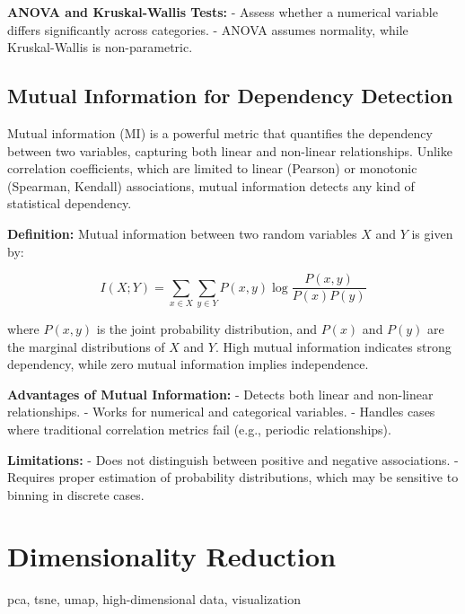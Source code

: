 \documentclass[12pt,openany]{book}
\begin{document}
\textbf{ANOVA and Kruskal-Wallis Tests:}
- Assess whether a numerical variable differs significantly across categories.
- ANOVA assumes normality, while Kruskal-Wallis is non-parametric.
\newline


\subsection{Mutual Information for Dependency Detection}

Mutual information (MI) is a powerful metric that quantifies the dependency between two variables, capturing both linear and non-linear relationships. Unlike correlation coefficients, which are limited to linear (Pearson) or monotonic (Spearman, Kendall) associations, mutual information detects any kind of statistical dependency.
\newline

\textbf{Definition:}
Mutual information between two random variables \( X \) and \( Y \) is given by:

\[
I(X; Y) = \sum_{x \in X} \sum_{y \in Y} P(x, y) \log \frac{P(x, y)}{P(x) P(y)}
\]

where \( P(x, y) \) is the joint probability distribution, and \( P(x) \) and \( P(y) \) are the marginal distributions of \( X \) and \( Y \). High mutual information indicates strong dependency, while zero mutual information implies independence.
\newline

\textbf{Advantages of Mutual Information:}
- Detects both linear and non-linear relationships.
- Works for numerical and categorical variables.
- Handles cases where traditional correlation metrics fail (e.g., periodic relationships).
\newline

\textbf{Limitations:}
- Does not distinguish between positive and negative associations.
- Requires proper estimation of probability distributions, which may be sensitive to binning in discrete cases.
\newline



\section{Dimensionality Reduction}

\begin{keywordsbox}
pca, tsne, umap, high-dimensional data, visualization
\end{keywordsbox}
\end{document}
